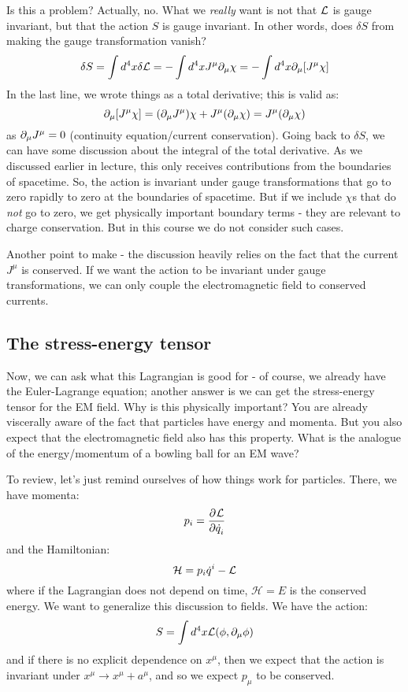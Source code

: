 Is this a problem? Actually, no. What we \emph{really} want is not that $\mathcal{L}$ is gauge invariant, but that the action $S$ is gauge invariant. In other words, does $\delta S$ from making the gauge transformation vanish?
\begin{equation}
    \delta S = \int d^4x \delta \mathcal{L} = -\int d^4x J^\mu \partial_\mu \chi = -\int d^4x \partial_\mu[J^\mu \chi]
\end{equation}
In the last line, we wrote things as a total derivative; this is valid as:
\begin{equation}
    \partial_\mu [J^\mu \chi] = (\partial_\mu J^\mu)\chi + J^\mu (\partial_\mu \chi) = J^\mu (\partial_\mu \chi)
\end{equation}
as $\partial_\mu J^\mu = 0$ (continuity equation/current conservation). Going back to $\delta S$, we can have some discussion about the integral of the total derivative. As we discussed earlier in lecture, this only receives contributions from the boundaries of spacetime. So, the action is invariant under gauge transformations that go to zero rapidly to zero at the boundaries of spacetime. But if we include $\chi$s that do \emph{not} go to zero, we get physically important boundary terms - they are relevant to charge conservation. But in this course we do not consider such cases.

Another point to make - the discussion heavily relies on the fact that the current $J^\mu$ is conserved. If we want the action to be invariant under gauge transformations, we can only couple the electromagnetic field to conserved currents.

\subsection{The stress-energy tensor}
Now, we can ask what this Lagrangian is good for - of course, we already have the Euler-Lagrange equation; another answer is we can get the stress-energy tensor for the EM field. Why is this physically important? You are already viscerally aware of the fact that particles have energy and momenta. But you also expect that the electromagnetic field also has this property. What is the analogue of the energy/momentum of a bowling ball for an EM wave?

To review, let's just remind ourselves of how things work for particles. There, we have momenta:
\begin{equation}
    p_i = \dpd{\LL}{\dot{q}_i}
\end{equation}
and the Hamiltonian:
\begin{equation}
    \mathcal{H} = p_i \dot{q}^i - \mathcal{L}
\end{equation}
where if the Lagrangian does not depend on time, $\mathcal{H} = E$ is the conserved energy. We want to generalize this discussion to fields. We have the action:
\begin{equation}
    S = \int d^4x\mathcal{L}(\phi, \partial_\mu \phi)
\end{equation}
and if there is no explicit dependence on $x^\mu$, then we expect that the action is invariant under $x^\mu \to x^\mu + a^\mu$, and so we expect $p_\mu$ to be conserved.

